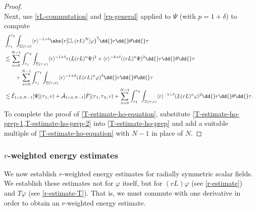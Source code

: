 \documentclass[10pt, reqno]{amsart}
\begin{document}
\begin{proof}
\begin{equation}
\end{equation}
Next, use \cref{rL-commutation} and \cref{rp-general} applied to \(\Psi{}\) (with \(p = 1 +
\delta{}\)) to compute
\begin{equation}\label{T-estimate-ho-prep-2}
\begin{split}
&\int_{\tau{}_1}^{\tau{}_2} \int _{\Sigma{}(\tau{},v)} \langle{}r\rangle{}^{-1+\delta{}}\abs{r[\Box{},(rL)^N]\varphi{}}^2 \dd{}r\dd{}\theta{}\dd{}\tau{} \\
&\lesssim \sum_{n=0}^{N-1}\int_{\tau{}_1}^{\tau{}_2} \int _{\Sigma{}(\tau{},v)} \langle{}r\rangle{}^{-1+\delta{}}r(L(rL)^n\Psi{})^2 + \langle{}r\rangle^{-4+\delta{}}((rL)^n\Psi{})^2\dd{}r\dd{}\theta{}\dd{}\tau{} \\
&\qquad +  \sum_{n=0}^{N-1}\int_{\tau{}_1}^{\tau{}_2} \int _{\Sigma{}(\tau{},v)} \langle{}r\rangle{}^{-1+\delta{}}(L(rL)^n\varphi{})^2 \dd{}r\dd{}\theta{}\dd{}\tau{} \\
&\lesssim \tilde{\mathcal{E}}_{1+\delta{},N-1}[\Psi{}](\tau{}_1,v) +  \tilde{\mathcal{A}}_{1+\delta{},N-1}[\tilde{F}](\tau{}_1,\tau{}_2,v) + \sum_{n=0}^{N-1}\int_{\tau{}_1}^{\tau{}_2} \int _{\Sigma{}(\tau{},v)} \langle{}r\rangle{}^{-1+\delta{}}(L(rL)^n\varphi{})^2 \dd{}r\dd{}\theta{}\dd{}\tau{}.
\end{split}
\end{equation}
To complete the proof of \cref{T-estimate-ho-equation}, substitute
\cref{T-estimate-ho-prep-1,T-estimate-ho-prep-2} into \cref{T-estimate-ho-prep} and
add a suitable multiple of \cref{T-estimate-ho-equation} with \(N-1\) in place of
\(N\).
\end{proof}
\subsubsection{\(r\)-weighted energy estimates}
\label{r-weighted-estimates} We now establish \(r\)-weighted energy estimates for
radially symmetric scalar fields. We establish these estimates not for
\(\varphi{}\) itself, but for \((rL)\varphi{}\) (see \cref{r-estimate}) and
\(T\varphi{}\) (see \cref{r-estimate-T}). That is, we must commute with one
derivative in order to obtain an \(r\)-weighted energy estimate.
\end{document}
